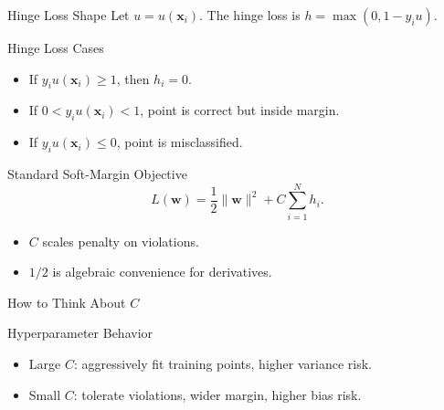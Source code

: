 \documentclass[10pt]{beamer}
\begin{document}
\begin{frame}{Hinge Loss Shape}
  \justifying
  Let $u=u(\bm{x}_i)$. The hinge loss is $h=\max(0,1-y_i u)$.
  \vspace{0.3em}

  \centering
\end{frame}

\begin{frame}{Hinge Loss Cases}
  \justifying
  \begin{itemize}
    \item If $y_i u(\bm{x}_i)\ge 1$, then $h_i=0$.
    \item If $0<y_i u(\bm{x}_i)<1$, point is correct but inside margin.
    \item If $y_i u(\bm{x}_i)\le 0$, point is misclassified.
  \end{itemize}
\end{frame}

\begin{frame}{Standard Soft-Margin Objective}
  \justifying
  \[
    L(\bm{w}) = \frac{1}{2}\|\bm{w}\|^2 + C\sum_{i=1}^N h_i.
  \]
  \begin{itemize}
    \item $C$ scales penalty on violations.
    \item $1/2$ is algebraic convenience for derivatives.
  \end{itemize}
\end{frame}

\begin{frame}{How to Think About $C$}
  \justifying
  \begin{warningbox}{Hyperparameter Behavior}
    \begin{itemize}
      \item Large $C$: aggressively fit training points, higher variance risk.
      \item Small $C$: tolerate violations, wider margin, higher bias risk.
    \end{itemize}
  \end{warningbox}
\end{frame}
\end{document}
